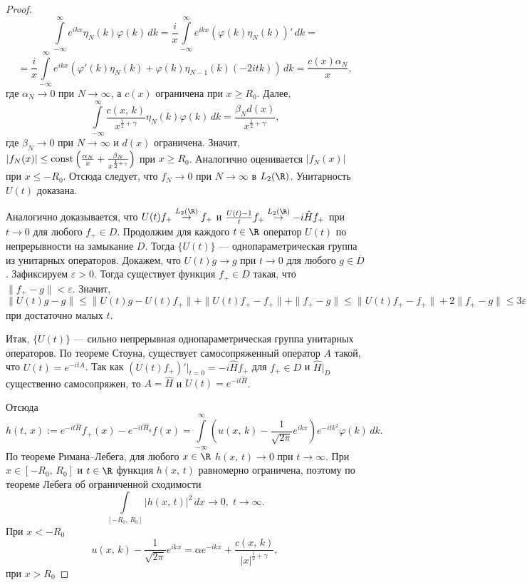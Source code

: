 \documentclass[a4paper
]{article}
\begin{document}
\begin{proof}
$$\int \limits_{-\infty}^\infty e^{ikx}\eta_N(k)\varphi(k)\, dk=
\frac{i}{x}\int \limits_{-\infty}^\infty e^{ikx}(\varphi(k)\eta_N(k))'
\, dk=$$ $$=\frac{i}{x}\int \limits_{-\infty}^\infty e^{ikx}(\varphi'(k)
\eta_N(k)+\varphi(k)\eta_{N-1}(k)(-2itk))\, dk=\frac{c(x)\alpha_N}{x},$$
где $\alpha_N\rightarrow 0$ при $N\rightarrow\infty$, а $c(x)$ ограничена при
$x\ge R_0$. Далее, $$\int \limits_{-\infty}^\infty \frac{c(x, \, k)}
{x^{\frac12+\gamma}}\eta_N(k)\varphi(k)\, dk=\frac{\beta_Nd(x)}{x^{\frac12
+\gamma}},$$ где $\beta_N\rightarrow 0$ при $N\rightarrow\infty$ и $d(x)$
ограничена. Значит, $|f_N(x)|\le {\rm const}\left(\frac{\alpha_N}{x}
+\frac{\beta_N}{x^{\frac12+\gamma}}\right)$ при $x\ge R_0$. Аналогично
оценивается $|f_N(x)|$ при $x\le -R_0$. Отсюда следует, что $f_N
\rightarrow 0$ при $N\rightarrow \infty$ в $L_2(\R)$. Унитарность $U(t)$
доказана. \par
Аналогично доказывается, что $U(t)f_+\stackrel{L_2(\R)}{\rightarrow}
f_+$ и $\frac{U(t)-1}{t}f_+\stackrel{L_2(\R)}{\rightarrow}
-i\hat Hf_+$ при $t\rightarrow 0$ для любого $f_+\in D$. Продолжим для каждого
$t\in \R$ оператор $U(t)$ по непрерывности на замыкание $D$. Тогда
$\{U(t)\}$ --- однопараметрическая группа из унитарных операторов.
Докажем, что $U(t)g\rightarrow g$ при $t\rightarrow 0$ для любого $g\in
\overline{D}$. Зафиксируем $\varepsilon>0$. Тогда существует функция
$f_+\in D$ такая, что $\|f_+-g\|<\varepsilon$. Значит, $\|U(t)g-g\|\le
\|U(t)g-U(t)f_+\|+\|U(t)f_+-f_+\|+\|f_+-g\|\le \|U(t)f_+-f_+\|+2\|f_+-g\|
\le 3\varepsilon$ при достаточно малых $t$. \par
Итак, $\{U(t)\}$ --- сильно непрерывная однопараметрическая группа
унитарных операторов. По теореме Стоуна, существует самосопряженный оператор
$A$ такой, что $U(t)=e^{-itA}$. Так как $(U(t)f_+)'|_{t=0}=-i\hat Hf_+$
для $f_+\in D$ и $\hat H|_D$ существенно самосопряжен, то $A=\hat H$ и $U(t)=
e^{-it\hat H}$. \par
Отсюда $$h(t, \, x):=e^{-it\hat H}f_+(x)-e^{-it\hat H_0}f(x)=\int \limits
_{-\infty}^\infty \left(u(x, \, k)-\frac{1}{\sqrt{2\pi}}e^{ikx}\right)
e^{-itk^2}\varphi(k)\, dk.$$
По теореме Римана--Лебега, для любого $x\in \R$ $h(x, \, t)\rightarrow 0$
при $t\rightarrow \infty$. При $x\in [-R_0, \, R_0]$ и $t\in \R$
функция $h(x, \, t)$ равномерно ограничена, поэтому по теореме Лебега
об ограниченной сходимости $$\int \limits_{[-R_0, \, R_0]}|h(x, \, t)|^2
\, dx\rightarrow 0, \; t\rightarrow \infty.$$ При $x<-R_0$
$$u(x, \, k)-\frac{1}{\sqrt{2\pi}}e^{ikx}=\alpha e^{-ikx}+\frac{c(x, \,
k)}{|x|^{\frac12+\gamma}},$$ при $x>R_0$

\end{proof}
\end{document}
